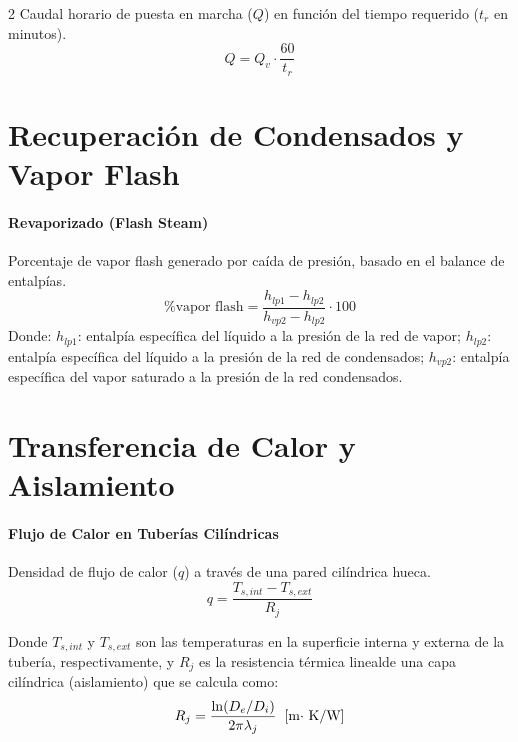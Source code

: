 \documentclass[11pt]{article}
\begin{document}
\begin{multicols*}{2}
    Caudal horario de puesta en marcha ($Q$) en función del tiempo requerido ($t_r$ en minutos).
    \begin{equation}
        Q = Q_v \cdot \frac{60}{t_r}
    \end{equation}
    
    \section*{Recuperación de Condensados y Vapor Flash}
    
    \paragraph*{Revaporizado (Flash Steam)}
    Porcentaje de vapor flash generado por caída de presión, basado en el balance de entalpías.
    \begin{equation}
        \%\text{vapor flash} = \frac{h_{lp1} - h_{lp2}}{h_{vp2}-h_{lp2}} \cdot 100
    \end{equation}
    Donde: $h_{lp1}$: entalpía específica del líquido a la presión de la red de vapor; $h_{lp2}$: entalpía específica del líquido a la presión de la red de condensados; $h_{vp2}$: entalpía específica del vapor saturado a la presión de la red condensados.
    
    \section*{Transferencia de Calor y Aislamiento}
    
    \paragraph*{Flujo de Calor en Tuberías Cilíndricas}
    Densidad de flujo de calor ($q$) a través de una pared cilíndrica hueca.
    \begin{equation}
        q = \frac{T_{s,int} - T_{s,ext}}{R_j}
    \end{equation}

    Donde $T_{s,int}$ y $T_{s,ext}$ son las temperaturas en la superficie interna y externa de la tubería, respectivamente, y $R_j$ es la resistencia térmica linealde una capa cilíndrica (aislamiento) que se calcula como: 
    \begin{equation}
        R_j = \frac{\ln(D_e / D_i)}{2 \pi \lambda_j} \hspace{0.2cm} \text{[m$\cdot$ K/W]}
    \end{equation}
        

\end{multicols*}
\end{document}
